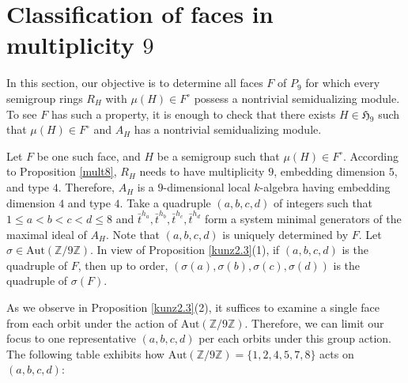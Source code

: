\documentclass{amsart}
\theoremstyle{plain}
\theoremstyle{definition}
\numberwithin{theorem}{section}
\numberwithin{equation}{section}
\numberwithin{equation}{theorem}
\begin{document}
\section{Classification of faces in multiplicity $9$}\label{section4}

In this section, our objective is to determine all faces $F$ of $P_9$ for which every semigroup rings $R_H$ with $\mu(H)\in F^{\circ}$ possess a nontrivial semidualizing module.
To see $F$ has such a property, it is enough to check that there exists $H\in\mathfrak{H}_9$ such that $\mu(H)\in F^{\circ}$ and $A_H$ has a nontrivial semidualizing module.

Let $F$ be one such face, and $H$ be a semigroup such that $\mu(H)\in F^{\circ}$.
According to Proposition \ref{mult8}, $R_H$ needs to have multiplicity $9$, embedding dimension $5$, and type $4$.
Therefore, $A_H$ is a $9$-dimensional local $k$-algebra having embedding dimension $4$ and type $4$.
Take a quadruple $(a,b,c,d)$ of integers such that $1 \le a <b <c <d \le 8$ and $\bar{t}^{h_a},\bar{t}^{h_b},\bar{t}^{h_c},\bar{t}^{h_d}$ form a system minimal generators of the maximal ideal of $A_H$.
Note that $(a,b,c,d)$ is uniquely determined by $F$.
Let $\sigma\in\mathrm{Aut}(\mathbb{Z}/9\mathbb{Z})$.
In view of Proposition \ref{kunz2.3}(1), if $(a,b,c,d)$ is the quadruple of $F$, then up to order, $(\sigma(a),\sigma(b),\sigma(c),\sigma(d))$ is the quadruple of $\sigma(F)$.

As we observe in Proposition \ref{kunz2.3}(2), it suffices to examine a single face from each orbit under the action of $\mathrm{Aut}(\mathbb{Z}/9\mathbb{Z})$.
Therefore, we can limit our focus to one representative $(a,b,c,d)$ per each orbits under this group action.
The following table exhibits how $\mathrm{Aut}(\mathbb{Z}/9\mathbb{Z})=\{1,2,4,5,7,8\}$ acts on $(a,b,c,d)$:
\end{document}

